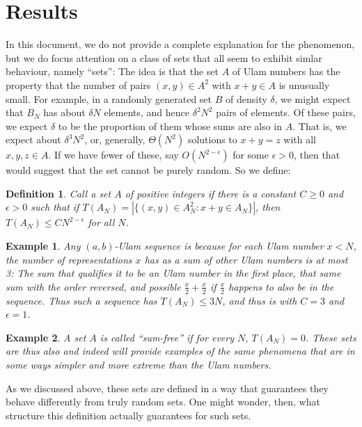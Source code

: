 \documentclass{report}
\newtheorem{definition}[theorem]{Definition}
\newtheorem{example}{Example}
\theoremstyle{remark}
\numberwithin{equation}{section}
\begin{document}
\section{Results}

In this document, we do not provide a complete explanation for the
phenomenon, but we do focus attention on a class of sets that all seem
to exhibit simlar behaviour, namely ``\relevant sets'': The idea is
that the set $A$ of Ulam numbers has the property that the number of
pairs $(x, y) \in A^2$ with $x + y \in A$ is unusually small.  For
example, in a randomly generated set $B$ of density $\delta$, we might
expect that $B_N$ has about $\delta N$ elements, and hence
$\delta^2 N^2$ pairs of elements.  Of these pairs, we expect $\delta$
to be the proportion of them whose sums are also in $A$.  That is, we
expect about $\delta^3 N^2$, or, generally, $\Theta(N^2)$ solutions to
$x + y = z$ with all $x, y, z \in A$.  If we have fewer of these, say
$O(N^{2-\epsilon})$ for some $\epsilon > 0$, then that would suggest
that the set cannot be purely random.  So we define:

\begin{definition}Call a set $A$ of positive integers
  \textbf{\relevant}if there is a constant $C \geq 0$ and
  $\epsilon > 0$ such that if
  $T(A_N) = |\{(x, y)\in A_N^2 : x + y \in A_N\}|$, then
  $T(A_N) \leq C N^{2-\epsilon}$ for all $N$.
\end{definition}

\begin{example}
  Any $(a,b)$-Ulam sequence is \relevant because for each Ulam number
  $x < N$, the number of representations $x$ has as a sum of other
  Ulam numbers is at most 3: The sum that qualifies it to be an Ulam
  number in the first place, that same sum with the order reversed,
  and possible $\frac{x}{2} + \frac{x}{2}$ if $\frac{x}{2}$ happens to
  also be in the sequence.  Thus such a sequence has $T(A_N) \leq 3N$,
  and thus is \relevant with $C = 3$ and $\epsilon = 1$.
\end{example}

\begin{example}
  A set $A$ is called ``sum-free'' if for every $N$, $T(A_N) = 0$.
  These sets are thus also \relevant and indeed will provide examples
  of the same phenomena that are in some ways simpler and more extreme
  than the Ulam numbers.
\end{example}

As we discussed above, these sets are defined in a way that guarantees
they behave differently from truly random sets.  One might wonder,
then, what structure this definition actually guarantees for such
sets.
\end{document}
